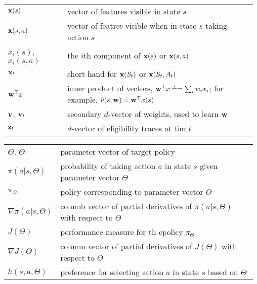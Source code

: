 \documentclass[10pt, landscape, a4paper]{article}
\begin{document}
\begin{multicols}{3}
        \begin{tabular}{ p{} p{} }
            $\vb{x}(s)$          & vector of features visible in state $s$                                                                                  \\
            $\vb{x}(s,a)$        & vector of featres visible when in state $s$ taking action $s$                                                            \\
            $x_i(s)$, $x_i(s,a)$ & the $i$th component of $\vb{x}(s)$ or $\vb{x}(s,a)$                                                                      \\
            $\vb{x}_t$           & short-hand for $\vb{x}(S_t)$ or $\vb{x}(S_t, A_t)$                                                                       \\
            $\vb{w}^\top x$      & inner product of vectors, $\vb{w}^\top x\doteq=\sum_{i}w_i x_i$; for example, $\hat{v}(s,\vb{w})\doteq \vb{w}^\top x(s)$ \\
            $\vb{v}$, $\vb{v}_t$ & secondary $d$-vector of weights, used to learn $\vb{w}$                                                                  \\
            $\vb{z}_t$           & $d$-vector of eligibility traces at tim $t$                                                                              \\
        \end{tabular}

        \begin{tabular}{ p{} p{} }
            $\Theta$, $\Theta$       & parameter vector of target policy                                                  \\
            $\pi(a|s,\Theta)$        & probability of taking action $a$ in state $s$ given parameter vector $\Theta$      \\
            $\pi_{\Theta}$           & policy corresponding to parameter vector $\Theta$                                  \\
            $\nabla \pi(a|s,\Theta)$ & columb vector of partial derivatives of $\pi(a|s,\Theta)$ with respect to $\Theta$ \\
            $J(\Theta)$              & performance measure for th epolicy $\pi_\Theta$                                    \\
            $\nabla J(\Theta)$       & column vector of partial derivatives of $J(\Theta)$ with respect to $\Theta$       \\
            $h(s,a,\Theta)$          & preference for selecting action $a$ in state $s$ based on $\Theta$                 \\
        \end{tabular}


\end{multicols}
\end{document}
